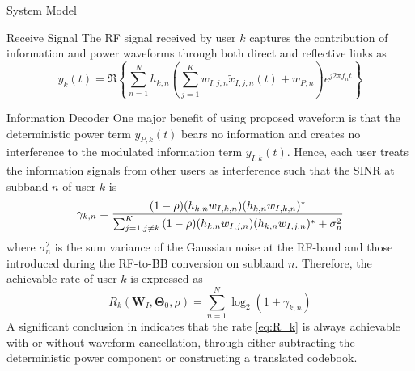 \documentclass{IEEEtran}
\begin{document}
\begin{section}{System Model}
	\begin{subsection}{Receive Signal}
		The RF signal received by user $k$ captures the contribution of information and power waveforms through both direct and reflective links as
		\begin{equation}\label{eq:y_k}
			y_k(t)=\Re\left\{\sum_{n=1}^N{h_{{k,n}}}\left(\sum_{j=1}^K{w_{I,j,n}\tilde{x}_{I,j,n}(t)}+w_{P,n}\right){e^{j2{\pi}{f_n}{t}}}\right\}
		\end{equation}
	\end{subsection}

	\begin{subsection}{Information Decoder}
		One major benefit of using proposed waveform is that the deterministic power term $y_{P,k}(t)$ bears no information and creates no interference to the modulated information term $y_{I,k}(t)$. Hence, each user treats the information signals from other users as interference such that the SINR at subband $n$ of user $k$ is
		\begin{equation}\label{eq:gamma_{k,n}}
			\gamma_{k,n}=\frac{(1-\rho)(h_{k,n}w_{I,k,n})(h_{k,n}w_{I,k,n})^*}{\sum_{j=1,j{\ne}k}^K{(1-\rho)(h_{k,n}w_{I,j,n})(h_{k,n}w_{I,j,n})^*+\sigma_n^2}}
		\end{equation}
		where $\sigma_n^2$ is the sum variance of the Gaussian noise at the RF-band and those introduced during the RF-to-BB conversion on subband $n$. Therefore, the achievable rate of user $k$ is expressed as
		\begin{equation}\label{eq:R_k}
			R_k(\boldsymbol{W}_I,\boldsymbol{\Theta}_0,\rho)=\sum_{n=1}^N{\log_2(1+\gamma_{k,n})}
		\end{equation}
		A significant conclusion in \cite{Clerckx2018b} indicates that the rate \ref{eq:R_k} is always achievable with or without waveform cancellation, through either subtracting the deterministic power component or constructing a translated codebook.
	\end{subsection}


\end{section}
\end{document}
